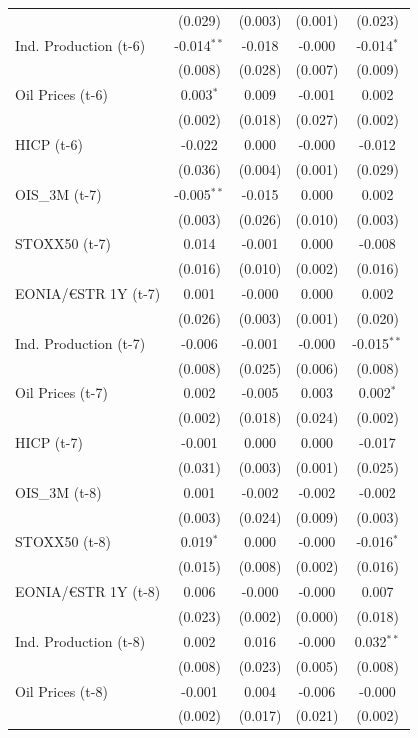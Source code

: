 \begin{longtable}[t]{lcccc}
 & (0.029) & (0.003) & (0.001) & (0.023)\\
Ind. Production (t-6) & -0.014$^{**}$ & -0.018 & -0.000 & -0.014$^{*}$\\
 & (0.008) & (0.028) & (0.007) & (0.009)\\
Oil Prices (t-6) & 0.003$^{*}$ & 0.009 & -0.001 & 0.002\\
 & (0.002) & (0.018) & (0.027) & (0.002)\\
HICP (t-6) & -0.022 & 0.000 & -0.000 & -0.012\\
 & (0.036) & (0.004) & (0.001) & (0.029)\\
OIS\_3M (t-7) & -0.005$^{**}$ & -0.015 & 0.000 & 0.002\\
 & (0.003) & (0.026) & (0.010) & (0.003)\\
STOXX50 (t-7) & 0.014 & -0.001 & 0.000 & -0.008\\
 & (0.016) & (0.010) & (0.002) & (0.016)\\
EONIA/€STR 1Y (t-7) & 0.001 & -0.000 & 0.000 & 0.002\\
 & (0.026) & (0.003) & (0.001) & (0.020)\\
Ind. Production (t-7) & -0.006 & -0.001 & -0.000 & -0.015$^{**}$\\
 & (0.008) & (0.025) & (0.006) & (0.008)\\
Oil Prices (t-7) & 0.002 & -0.005 & 0.003 & 0.002$^{*}$\\
 & (0.002) & (0.018) & (0.024) & (0.002)\\
HICP (t-7) & -0.001 & 0.000 & 0.000 & -0.017\\
 & (0.031) & (0.003) & (0.001) & (0.025)\\
OIS\_3M (t-8) & 0.001 & -0.002 & -0.002 & -0.002\\
 & (0.003) & (0.024) & (0.009) & (0.003)\\
STOXX50 (t-8) & 0.019$^{*}$ & 0.000 & -0.000 & -0.016$^{*}$\\
 & (0.015) & (0.008) & (0.002) & (0.016)\\
EONIA/€STR 1Y (t-8) & 0.006 & -0.000 & -0.000 & 0.007\\
 & (0.023) & (0.002) & (0.000) & (0.018)\\
Ind. Production (t-8) & 0.002 & 0.016 & -0.000 & 0.032$^{**}$\\
 & (0.008) & (0.023) & (0.005) & (0.008)\\
Oil Prices (t-8) & -0.001 & 0.004 & -0.006 & -0.000\\
 & (0.002) & (0.017) & (0.021) & (0.002)\\

\end{longtable}
